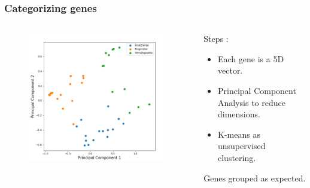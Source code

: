 \documentclass{beamer}
\begin{document}
\begin{frame}
	\frametitle{Categorizing genes}
	\begin{columns}[T] %
		\begin{column}{.48\textwidth}
			\begin{figure}
				\includegraphics*[width=  \linewidth]{../Preliminary/genepca.png}
			\end{figure}
		\end{column}%
		\hfill%
		\begin{column}{.6\textwidth}
			Steps :\\
			\begin{itemize}
			\item Each gene is a 5D vector.
			\item Principal Component Analysis to reduce dimensions.
			\item K-means as unsupervised clustering.
			\end{itemize}
			Genes grouped as expected.\\
		\end{column}%
	\end{columns}
\end{frame}
\end{document}
